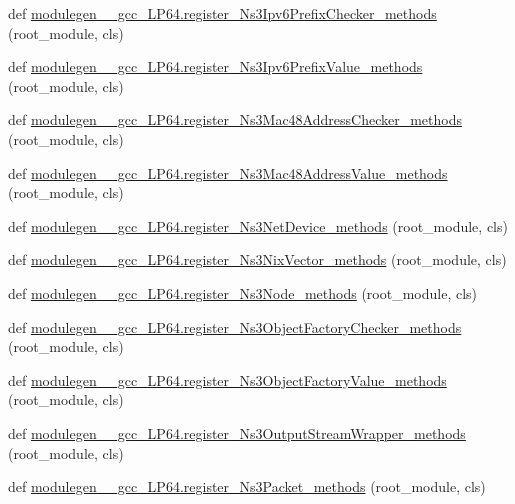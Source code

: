 \begin{DoxyCompactItemize}
\item 
def \hyperlink{namespacemodulegen____gcc__LP64_ab45b7cad858b5fb8fd4921640270716f}{modulegen\+\_\+\+\_\+gcc\+\_\+\+L\+P64.\+register\+\_\+\+Ns3\+Ipv6\+Prefix\+Checker\+\_\+methods} (root\+\_\+module, cls)
\item 
def \hyperlink{namespacemodulegen____gcc__LP64_a24017f7931b685270f9f9cae9dbc1f2e}{modulegen\+\_\+\+\_\+gcc\+\_\+\+L\+P64.\+register\+\_\+\+Ns3\+Ipv6\+Prefix\+Value\+\_\+methods} (root\+\_\+module, cls)
\item 
def \hyperlink{namespacemodulegen____gcc__LP64_a8b5d96f51d4bdc5d94489bcc0a50e648}{modulegen\+\_\+\+\_\+gcc\+\_\+\+L\+P64.\+register\+\_\+\+Ns3\+Mac48\+Address\+Checker\+\_\+methods} (root\+\_\+module, cls)
\item 
def \hyperlink{namespacemodulegen____gcc__LP64_aa62ae7526abc00b083df3d90589e2e92}{modulegen\+\_\+\+\_\+gcc\+\_\+\+L\+P64.\+register\+\_\+\+Ns3\+Mac48\+Address\+Value\+\_\+methods} (root\+\_\+module, cls)
\item 
def \hyperlink{namespacemodulegen____gcc__LP64_a2518a92fbd97a7666c5b4897eeb07c34}{modulegen\+\_\+\+\_\+gcc\+\_\+\+L\+P64.\+register\+\_\+\+Ns3\+Net\+Device\+\_\+methods} (root\+\_\+module, cls)
\item 
def \hyperlink{namespacemodulegen____gcc__LP64_a5cca2624411c350fed578acdd9616437}{modulegen\+\_\+\+\_\+gcc\+\_\+\+L\+P64.\+register\+\_\+\+Ns3\+Nix\+Vector\+\_\+methods} (root\+\_\+module, cls)
\item 
def \hyperlink{namespacemodulegen____gcc__LP64_a158d48a8db192c306a8eff9ae0b0503a}{modulegen\+\_\+\+\_\+gcc\+\_\+\+L\+P64.\+register\+\_\+\+Ns3\+Node\+\_\+methods} (root\+\_\+module, cls)
\item 
def \hyperlink{namespacemodulegen____gcc__LP64_a4f37eb35629332dd2318799b3efe197e}{modulegen\+\_\+\+\_\+gcc\+\_\+\+L\+P64.\+register\+\_\+\+Ns3\+Object\+Factory\+Checker\+\_\+methods} (root\+\_\+module, cls)
\item 
def \hyperlink{namespacemodulegen____gcc__LP64_aa08b54c074e688b2a88a54ada11db8fc}{modulegen\+\_\+\+\_\+gcc\+\_\+\+L\+P64.\+register\+\_\+\+Ns3\+Object\+Factory\+Value\+\_\+methods} (root\+\_\+module, cls)
\item 
def \hyperlink{namespacemodulegen____gcc__LP64_acc3c2935e4b09f91d6a35d059f746a4a}{modulegen\+\_\+\+\_\+gcc\+\_\+\+L\+P64.\+register\+\_\+\+Ns3\+Output\+Stream\+Wrapper\+\_\+methods} (root\+\_\+module, cls)
\item 
def \hyperlink{namespacemodulegen____gcc__LP64_a6784a1ccebf471415830ba331480b02c}{modulegen\+\_\+\+\_\+gcc\+\_\+\+L\+P64.\+register\+\_\+\+Ns3\+Packet\+\_\+methods} (root\+\_\+module, cls)

\end{DoxyCompactItemize}
